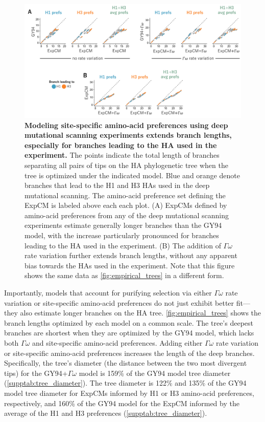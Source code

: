 \documentclass[11pt]{article}
\begin{document}
\begin{figure}
\centerline{\includegraphics[width=\textwidth]{figures/empirical_scatter.pdf}}
\caption{\label{fig:empirical_scatter}
\textbf{Modeling site-specific amino-acid preferences using deep mutational scanning experiments extends branch lengths, especially for branches leading to the HA used in the experiment.}
The points indicate the total length of branches separating all pairs of tips on the HA phylogenetic tree when the tree is optimized under the indicated model. 
Blue and orange denote branches that lead to the H1 and H3 HAs used in the deep mutational scanning. 
The amino-acid preference set defining the ExpCM is labeled above each each plot.
(A) ExpCMs defined by amino-acid preferences from any of the deep mutational scanning experiments estimate generally longer branches than the GY94 model, with the increase particularly pronounced for branches leading to the HA used in the experiment. 
(B) The addition of $\Gamma\omega$ rate variation further extends branch lengths, without any apparent bias towards the HAs used in the experiment.
Note that this figure shows the same data as \ref{fig:empirical_trees} in a different form.
}
\end{figure}

Importantly, models that account for purifying selection via either $\Gamma\omega$ rate variation or site-specific amino-acid preferences do not just exhibit better fit---they also estimate longer branches on the HA tree. 
\ref{fig:empirical_trees} shows the branch lengths optimized by each model on a common scale.
The tree's deepest branches are shortest when they are optimized by the GY94 model, which lacks both $\Gamma\omega$ and site-specific amino-acid preferences.
Adding either $\Gamma\omega$ rate variation or site-specific amino-acid preferences increases the length of the deep branches.
Specifically, the tree's diameter (the distance between the two most divergent tips) for the GY94+$\Gamma\omega$ model is 159\% of the GY94 model tree diameter (\ref{supptab:tree_diameter}).
The tree diameter is 122\% and 135\% of the GY94 model tree diameter for ExpCMs informed by H1 or H3 amino-acid preferences, respectively, and 160\% of the GY94 model for the ExpCM informed by the average of the H1 and H3 preferences (\ref{supptab:tree_diameter}).
\end{document}
